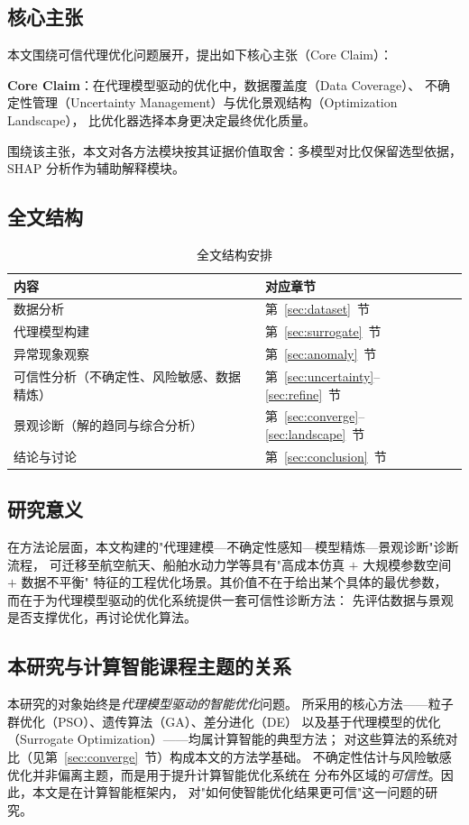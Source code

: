 \subsection{核心主张}

本文围绕可信代理优化问题展开，提出如下核心主张（Core Claim）：

\begin{chapterquestion}
\textbf{Core Claim}：在代理模型驱动的优化中，数据覆盖度（Data Coverage）、
不确定性管理（Uncertainty Management）与优化景观结构（Optimization Landscape），
比优化器选择本身更决定最终优化质量。
\end{chapterquestion}

围绕该主张，本文对各方法模块按其证据价值取舍：多模型对比仅保留选型依据，
SHAP 分析作为辅助解释模块。

\subsection{全文结构}

\begin{table}[H]
\centering
\caption{全文结构安排}
\begin{tabular}{ll}
\toprule
内容 & 对应章节 \\
\midrule
数据分析 & 第~\ref{sec:dataset}~节 \\
代理模型构建 & 第~\ref{sec:surrogate}~节 \\
异常现象观察 & 第~\ref{sec:anomaly}~节 \\
可信性分析（不确定性、风险敏感、数据精炼） & 第~\ref{sec:uncertainty}--\ref{sec:refine}~节 \\
景观诊断（解的趋同与综合分析） & 第~\ref{sec:converge}--\ref{sec:landscape}~节 \\
结论与讨论 & 第~\ref{sec:conclusion}~节 \\
\bottomrule
\end{tabular}
\end{table}

\subsection{研究意义}

在方法论层面，本文构建的"代理建模—不确定性感知—模型精炼—景观诊断"诊断流程，
可迁移至航空航天、船舶水动力学等具有"高成本仿真 $+$ 大规模参数空间 $+$ 数据不平衡"
特征的工程优化场景。其价值不在于给出某个具体的最优参数，
而在于为代理模型驱动的优化系统提供一套可信性诊断方法：
先评估数据与景观是否支撑优化，再讨论优化算法。

\subsection{本研究与计算智能课程主题的关系}

本研究的对象始终是\emph{代理模型驱动的智能优化}问题。
所采用的核心方法——粒子群优化（PSO）、遗传算法（GA）、差分进化（DE）
以及基于代理模型的优化（Surrogate Optimization）——均属计算智能的典型方法；
对这些算法的系统对比（见第~\ref{sec:converge}~节）构成本文的方法学基础。
不确定性估计与风险敏感优化并非偏离主题，而是用于提升计算智能优化系统在
分布外区域的\emph{可信性}。因此，本文是在计算智能框架内，
对"如何使智能优化结果更可信"这一问题的研究。
